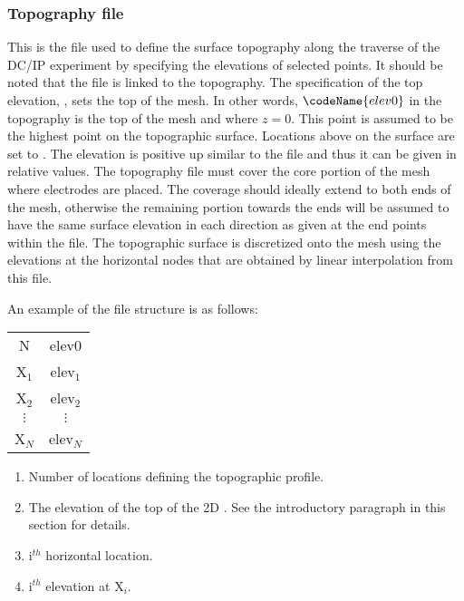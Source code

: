 \subsubsection{Topography file}

This is the file used to define the surface topography along the traverse of the DC/IP experiment by specifying the elevations of selected points. It should be noted that the  file is linked to the topography. The specification of the top elevation, , sets the top of the mesh. In other words, $\codeName{elev0}$ in the topography is the top of the mesh and where $z=0$. This point is assumed to be the highest point on the topographic surface. Locations above  on the surface are set to . The elevation is positive up similar to the  file and thus it can be given in relative values. The topography file must cover the core portion of the mesh where electrodes are placed. The coverage should ideally extend to both ends of the mesh, otherwise the remaining portion towards the ends will be assumed to have the same surface elevation in each direction as given at the end points within the file. The topographic surface is discretized onto the mesh using the elevations at the horizontal nodes that are obtained by linear interpolation from this file. 

An example of the  file structure is as follows:

\begin{fileExample}
\begin{tabular}{|cc|}
\hline
N & elev0 \\
X$_1$ & elev$_1$ \\
X$_2$ & elev$_2$ \\
$\vdots$ & $\vdots$\\
X$_N$ & elev$_N$ \\
\hline
\end{tabular}
\end{fileExample}

\begin{enumerate}
\item[\codeName{N}] Number of locations defining the topographic profile.
\item[\codeName{elev0}] The elevation of the top of the 2D . See the introductory paragraph in this section for details. 
\item[\codeName{X$_i$ }] i$^{th}$ horizontal location.
\item[\codeName{elev$_i$ }] i$^{th}$ elevation at X$_i$.
\end{enumerate}

